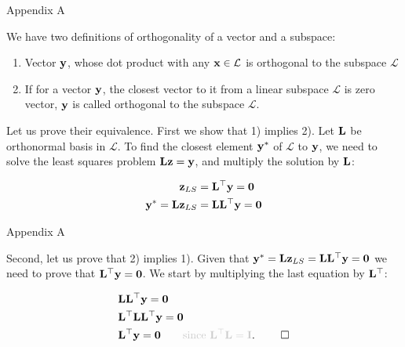 \documentclass{beamer}
\begin{document}
\myqrframe



\begin{frame}{Appendix A}
	\begin{flushleft}
		
		We have two definitions of orthogonality of a vector and a subspace:
		
		\begin{enumerate}
			\item Vector $\mathbf{y}$, whose dot product with any $\mathbf{x} \in \mathcal{L}$ is orthogonal to the subspace $\mathcal{L}$
			
			\item If for a vector $\mathbf{y}$, the closest vector to it from a linear subspace $\mathcal{L}$ is zero vector, $\mathbf{y}$ is called orthogonal to the subspace $\mathcal{L}$.
		\end{enumerate}
		
	Let us prove their equivalence. First we show that 1) implies 2). Let $\mathbf{L}$ be orthonormal basis in $\mathcal{L}$. To find the closest element $\mathbf{y}^*$ of $\mathcal{L}$ to $\mathbf{y}$, we need to solve the least squares problem $\mathbf{L}\mathbf{z} = \mathbf{y}$, and multiply the solution by $\mathbf{L}$:
	
	\begin{align}
		\mathbf{z}_{LS} &= \mathbf{L}^\top \mathbf{y} = \mathbf{0} \\
    	\mathbf{y}^* = \mathbf{L}\mathbf{z}_{LS} &= \mathbf{L}\mathbf{L}^\top \mathbf{y} = \mathbf{0}
	\end{align}		
		
	\end{flushleft}
\end{frame}


\begin{frame}{Appendix A}
	\begin{flushleft}
		
		
		Second, let us prove that 2) implies 1). Given that $\mathbf{y}^* = \mathbf{L}\mathbf{z}_{LS} = \mathbf{L}\mathbf{L}^\top \mathbf{y} = \mathbf{0}$ we need to prove that $\mathbf{L}^\top \mathbf{y} = \mathbf{0}$. We start by multiplying the last equation by $\mathbf{L}^\top$:
		
		\begin{align}
			& \bo{L}\bo{L}\T \bo{y} = \bo{0} \\
			& \bo{L}\T \bo{L}\bo{L}\T \bo{y} = \bo{0} \\
			& \bo{L}\T \bo{y} = \bo{0}  \ \ \ \ \ \ \textcolor{mygray}{\text{since }  \bo{L}\T \bo{L} = \bo{I}}. \ \qed
		\end{align}		
		
	\end{flushleft}
\end{frame}
\end{document}
